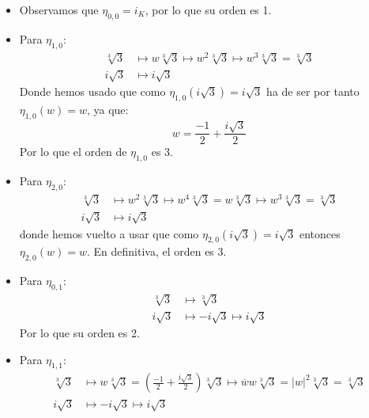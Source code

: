 \begin{ejercicio}
\begin{enumerate}
            \begin{itemize}
                \item Observamos que $\eta_{0,0} = i_K$, por lo que su orden es 1.
                \item Para $\eta_{1,0}$:
                    \begin{align*}
                        \sqrt[3]{3} &\longmapsto w\sqrt[3]{3} \longmapsto w^2\sqrt[3]{3} \longmapsto w^3\sqrt[3]{3}  = \sqrt[3]{3}\\
                        i\sqrt{3}&\longmapsto i\sqrt{3}
                    \end{align*}
                    Donde hemos usado que como $\eta_{1,0}\left(i\sqrt{3}\right) = i\sqrt{3}$ ha de ser por tanto $\eta_{1,0}(w) = w$, ya que:
                    \begin{equation*}
                        w = \frac{-1}{2}+\frac{i\sqrt{3}}{2}
                    \end{equation*}
                    Por lo que el orden de $\eta_{1,0}$ es 3.
                \item Para $\eta_{2,0}$:
                    \begin{align*}
                        \sqrt[3]{3}&\longmapsto w^2\sqrt[3]{3} \longmapsto w^4\sqrt[3]{3} = w\sqrt[3]{3} \longmapsto w^3\sqrt[3]{3} = \sqrt[3]{3} \\
                        i\sqrt{3} &\longmapsto i\sqrt{3}
                    \end{align*}
                    donde hemos vuelto a usar que como $\eta_{2,0}\left(i\sqrt{3}\right) = i\sqrt{3}$ entonces $\eta_{2,0}(w) = w$. En definitiva, el orden es 3.
                \item Para $\eta_{0,1}$:
                    \begin{align*}
                        \sqrt[3]{3}&\longmapsto \sqrt[3]{3} \\
                        i\sqrt{3} &\longmapsto -i\sqrt{3} \longmapsto i\sqrt{3}
                    \end{align*}
                    Por lo que su orden es 2.
                \item Para $\eta_{1,1}$:
                    \begin{align*}
                        \sqrt[3]{3}&\longmapsto w\sqrt[3]{3} = \left(\frac{-1}{2}+\frac{i\sqrt{3}}{2}\right)\sqrt[3]{3} \longmapsto \overline{w}w\sqrt[3]{3} = |w|^2\sqrt[3]{3} = \sqrt[3]{3} \\
                        i\sqrt{3} &\longmapsto -i\sqrt{3} \longmapsto i\sqrt{3}

\end{align*}
\end{itemize}
\end{enumerate}
\end{ejercicio}
